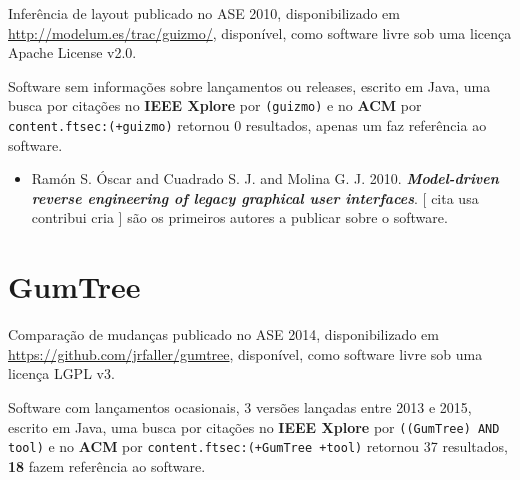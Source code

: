 Inferência de layout
publicado no ASE 2010,
disponibilizado em \url{http://modelum.es/trac/guizmo/},
disponível,
como software livre
sob uma licença Apache License v2.0.

Software sem informações sobre lançamentos ou releases,
escrito em Java,
uma busca por citações no {\bf IEEE Xplore} por
\texttt{(guizmo)}
e no {\bf ACM} por
\texttt{content.ftsec:(+guizmo)}
retornou
0 resultados,
apenas um faz referência ao software.

\begin{itemize}
\item Ram{\'{o}}n S. {\'{O}}scar and Cuadrado S. J. and Molina G. J.
      2010.
        \textbf{\textit{ Model-driven reverse engineering of legacy graphical user interfaces}}.
      [
          cita
          usa
          contribui
          cria
      ]
são os primeiros autores a publicar sobre o software.
\end{itemize}
\section{GumTree}

Comparação de mudanças
publicado no ASE 2014,
disponibilizado em \url{https://github.com/jrfaller/gumtree},
disponível,
como software livre
sob uma licença LGPL v3.

Software com lançamentos ocasionais,
3 versões lançadas
entre 2013 e 2015,
escrito em Java,
uma busca por citações no {\bf IEEE Xplore} por
\texttt{((GumTree) AND tool)}
e no {\bf ACM} por
\texttt{content.ftsec:(+GumTree +tool)}
retornou
37 resultados,
{\bf 18} fazem referência ao software.

